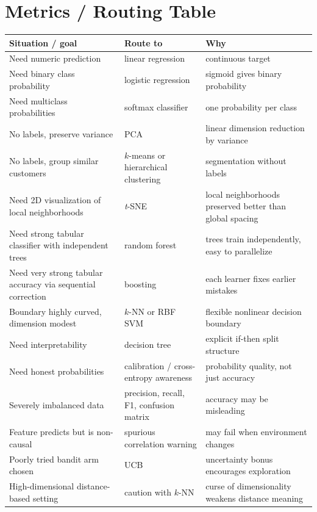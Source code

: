 \documentclass[11pt,landscape]{article}
\begin{document}
	\vspace{0.2em}
	
	\section{Metrics / Routing Table}
	\begin{tabularx}{\linewidth}{@{}L{2.1in}L{1.55in}L{3.5in}@{}}
		\toprule
		\textbf{Situation / goal} & \textbf{Route to} & \textbf{Why} \\
		\midrule
		Need numeric prediction & linear regression & continuous target \\
		Need binary class probability & logistic regression & sigmoid gives binary probability \\
		Need multiclass probabilities & softmax classifier & one probability per class \\
		No labels, preserve variance & PCA & linear dimension reduction by variance \\
		No labels, group similar customers & $k$-means or hierarchical clustering & segmentation without labels \\
		Need 2D visualization of local neighborhoods & \textit{t}-SNE & local neighborhoods preserved better than global spacing \\
		Need strong tabular classifier with independent trees & random forest & trees train independently, easy to parallelize \\
		Need very strong tabular accuracy via sequential correction & boosting & each learner fixes earlier mistakes \\
		Boundary highly curved, dimension modest & $k$-NN or RBF SVM & flexible nonlinear decision boundary \\
		Need interpretability & decision tree & explicit if-then split structure \\
		Need honest probabilities & calibration / cross-entropy awareness & probability quality, not just accuracy \\
		Severely imbalanced data & precision, recall, F1, confusion matrix & accuracy may be misleading \\
		Feature predicts but is non-causal & spurious correlation warning & may fail when environment changes \\
		Poorly tried bandit arm chosen & UCB & uncertainty bonus encourages exploration \\
		High-dimensional distance-based setting & caution with $k$-NN & curse of dimensionality weakens distance meaning \\
		\bottomrule
	\end{tabularx}
	
\end{document}
